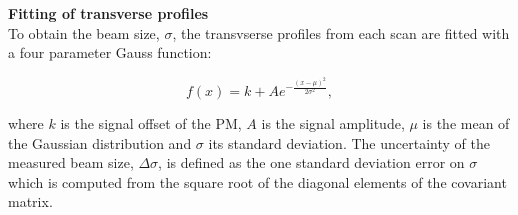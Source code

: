 \normalsize{\textbf{Fitting of transverse profiles}}\\
To obtain the beam size, $\sigma$, the transvserse profiles from each scan are fitted with a four parameter Gauss function:

\begin{equation}\label{eq:4p_gauss}
   f(x) = k + A e^{-\frac{(x-\mu)^2}{2 \sigma^2}},
\end{equation}

where $k$ is the signal offset of the PM, $A$ is the signal amplitude, $\mu$ is the mean of the Gaussian distribution and $\sigma$ its standard deviation. The uncertainty of the measured beam size, $\Delta \sigma$, is defined as the one standard deviation error on $\sigma$ which is computed from the square root of the diagonal elements of the covariant matrix.

